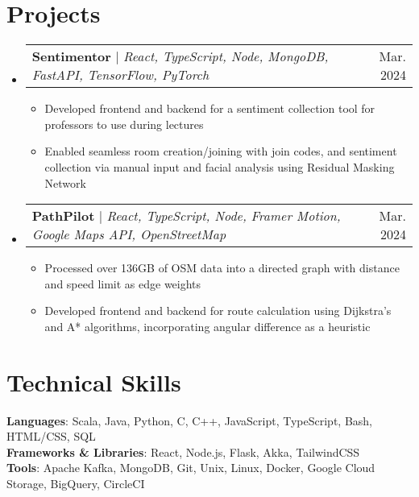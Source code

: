 \documentclass[letterpaper,12pt]{article}
\makeatletter
\newcommand{\resumeItem}[1]{
  \item\small{
    {#1 \vspace{-2pt}}
  }
}
\newcommand{\resumeProjectHeading}[2]{
    \item
    \begin{tabular*}{0.97\textwidth}{l@{\extracolsep{\fill}}r}
      \small#1 & #2 \\
    \end{tabular*}\vspace{-7pt}
}
\newcommand{\resumeSubHeadingListStart}{\begin{itemize}[leftmargin=0.15in, label={}]}
\newcommand{\resumeSubHeadingListEnd}{\end{itemize}}
\newcommand{\resumeItemListStart}{\begin{itemize}}
\newcommand{\resumeItemListEnd}{\end{itemize}\vspace{-5pt}}
\makeatother
\begin{document}
\section{Projects}
    \resumeSubHeadingListStart
      \resumeProjectHeading
          {\textbf{Sentimentor} $|$ \emph{React, TypeScript, Node, MongoDB, FastAPI, TensorFlow, PyTorch}}{Mar. 2024}
          \resumeItemListStart
            \resumeItem{Developed frontend and backend for a sentiment collection tool for professors to use during lectures}
            \resumeItem{Enabled seamless room creation/joining with join codes, and sentiment collection via manual input and facial analysis using Residual Masking Network}
          \resumeItemListEnd
      \resumeProjectHeading
          {\textbf{PathPilot} $|$ \emph{React, TypeScript, Node, Framer Motion, Google Maps API, OpenStreetMap}}{Mar. 2024}
          \resumeItemListStart
            \resumeItem{Processed over 136GB of OSM data into a directed graph with distance and speed limit as edge weights}
            \resumeItem{Developed frontend and backend for route calculation using Dijkstra’s and A* algorithms, incorporating angular difference as a heuristic}
          \resumeItemListEnd
    \resumeSubHeadingListEnd


\section{Technical Skills}
 \begin{itemize}[leftmargin=0.15in, label={}]
    \small{\item{
     \textbf{Languages}{: Scala, Java, Python, C, C++, JavaScript, TypeScript, Bash, HTML/CSS, SQL} \\
     \textbf{Frameworks \& Libraries}{: React, Node.js, Flask, Akka, TailwindCSS} \\
     \textbf{Tools}{: Apache Kafka, MongoDB, Git, Unix, Linux, Docker, Google Cloud Storage, BigQuery, CircleCI} \\
    }}
 \end{itemize}
\end{document}
